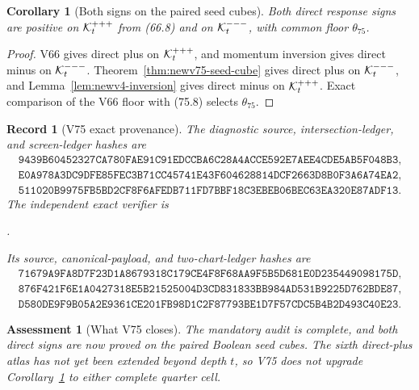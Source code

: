\documentclass[11pt,oneside]{article}
\newtheorem{corollary}[theorem]{Corollary}
\newtheorem{assessment}[theorem]{Assessment}
\newtheorem{record}[theorem]{Record}
\theoremstyle{definition}
\theoremstyle{remark}
\begin{document}
\begin{corollary}[Both signs on the paired seed cubes]
\label{cor:newv75-both-signs}
Both direct response signs are positive on
\({\cal K}^{+++}_t\) from (66.8) and on
\({\cal K}^{---}_t\), with common floor \(\theta_{75}\).
\end{corollary}

\begin{proof}
V66 gives direct plus on \({\cal K}^{+++}_t\), and momentum
inversion gives direct minus on \({\cal K}^{---}_t\).
Theorem~\ref{thm:newv75-seed-cube} gives direct plus on
\({\cal K}^{---}_t\), and Lemma~\ref{lem:newv4-inversion} gives
direct minus on \({\cal K}^{+++}_t\).  Exact comparison of the V66
floor with (75.8) selects \(\theta_{75}\).
\end{proof}

\begin{record}[V75 exact provenance]
\label{rec:newv75-provenance}
The diagnostic source, intersection-ledger, and screen-ledger hashes
are
\[
\begin{gathered}
\texttt{9439B60452327CA780FAE91C91EDCCBA6C28A4ACCE592E7AEE4CDE5AB5F048B3},\\
\texttt{E0A978A3DC9DFE85FEC3B71CC45741E43F604628814DCF2663D8B0F3A6A74EA2},\\
\texttt{511020B9975FB5BD2CF8F6AFEDB711FD7BBF18C3EBEB06BEC63EA320E87ADF13}.
\end{gathered}                                          \tag{75.10}
\]
The independent exact verifier is
\begin{center}
\footnotesize
{}.
\end{center}
Its source, canonical-payload, and two-chart-ledger hashes are
\[
\begin{gathered}
\texttt{71679A9FA8D7F23D1A8679318C179CE4F8F68AA9F5B5D681E0D235449098175D},\\
\texttt{876F421F6E1A0427318E5B21525004D3CD831833BB984AD531B9225D762BDE87},\\
\texttt{D580DE9F9B05A2E9361CE201FB98D1C2F87793BE1D7F57CDC5B4B2D493C40E23}.
\end{gathered}                                          \tag{75.11}
\]
\end{record}

\begin{assessment}[What V75 closes]
\label{ass:newv75}
The mandatory audit is complete, and both direct signs are now
proved on the paired Boolean seed cubes.  The sixth direct-plus
atlas has not yet been extended beyond depth \(t\), so V75 does not
upgrade Corollary~\ref{cor:newv75-both-signs} to either complete
quarter cell.
\end{assessment}
\end{document}
